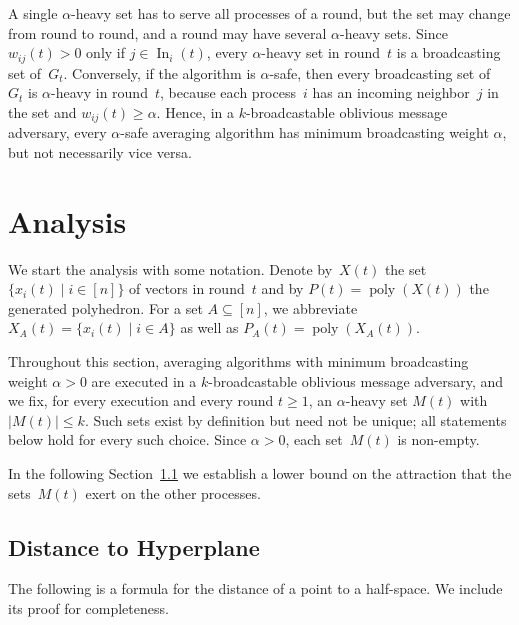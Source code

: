 \documentclass[preprint,12pt,a4paper]{elsarticle}
\theoremstyle{plain}
\theoremstyle{definition}
\renewcommand{\leq}{\leqslant}
\renewcommand{\geq}{\geqslant}
\DeclareMathOperator\In{In}
\DeclareMathOperator\poly{poly}
\begin{document}
A single $\alpha$-heavy set has to serve all processes of a round, but the set may change from round to round, and a round may have several $\alpha$-heavy sets.
Since $w_{ij}(t) > 0$ only if $j \in \In_i(t)$, every $\alpha$-heavy set in round~$t$ is a broadcasting set of~$G_t$.
Conversely, if the algorithm is $\alpha$-safe, then every broadcasting set of~$G_t$ is $\alpha$-heavy in round~$t$, because each process~$i$ has an incoming neighbor~$j$ in the set and $w_{ij}(t) \geq \alpha$.
Hence, in a $k$-broadcastable oblivious message adversary, every $\alpha$-safe averaging algorithm has minimum broadcasting weight $\alpha$, but not necessarily vice versa.


\section{Analysis}\label{sec:analysis}

We start the analysis with some notation.
Denote by~$X(t)$ the set
$\{ x_i(t) \mid i \in [n] \}$
of vectors in round~$t$
and
by
$P(t) = \poly(X(t))$ the generated polyhedron.
For a set $A \subseteq [n]$, we
abbreviate $X_A(t) = \{ x_i(t) \mid i \in A \}$
as well as $P_A(t) = \poly(X_A(t))$.

Throughout this section, averaging algorithms with minimum broadcasting weight $\alpha > 0$ are executed in a $k$-broadcastable oblivious message adversary, and we fix, for every execution and every round $t \geq 1$, an $\alpha$-heavy set $M(t)$ with $\lvert M(t)\rvert \leq k$.
Such sets exist by definition but need not be unique; all statements below hold for every such choice.
Since $\alpha > 0$, each set~$M(t)$ is non-empty.

In the following Section~\ref{sec:distance_H} we establish a lower bound on the attraction that the sets~$M(t)$ exert on the other processes.


\subsection{Distance to Hyperplane}
\label{sec:distance_H}

The following is a formula for the distance of a point to a half-space.
We include its proof for completeness.
\end{document}

